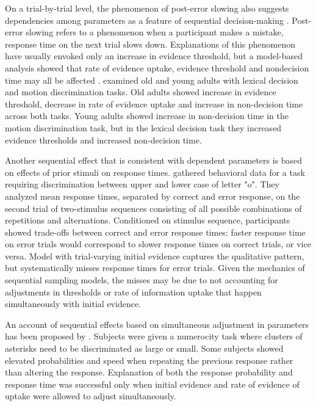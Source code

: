 \documentclass[12pt]{report}
\begin{document}
On a trial-by-trial level, the phenomenon of post-error slowing also suggests dependencies among parameters as a feature of sequential decision-making \citep{VanMal2004}. Post-error slowing refers to a phenomenon when a participant makes a mistake, response time on the next trial slows down. Explanations of this phenomenon have usually envoked only an increase in evidence threshold, but a model-based analysis showed that rate of evidence uptake, evidence threshold and nondecision time may all be affected \citep{DutFor2013}. \citet{DutFor2013} examined old and young adults with lexical decision and motion discrimination tasks. Old adults showed increase in evidence threshold, decrease in rate of evidence uptake and increase in non-decision time across both tasks. Young adults showed increase in non-decision time in the motion discrimination task, but in the lexical decision task they increased evidence thresholds and increased non-decision time. 

Another sequential effect that is consistent with dependent parameters is based on effects of prior stimuli on response times. \citet{GolWon2012} gathered behavioral data for a task requiring discrimination between upper and lower case of letter "o". They analyzed mean response times, separated by correct and error response, on the second trial of two-stimulus sequences consisting of all possible combinations of repetitions and alternations. Conditioned on stimulus sequence, participants showed trade-offs between correct and error response times: faster response time on error trials would correspond to slower response times on correct trials, or vice versa. Model with trial-varying initial evidence captures the qualitative pattern, but systematically misses response times for error trials. Given the mechanics of sequential sampling models, the misses may be due to not accounting for adjustments in thresholds or rate of information uptake that happen simultaneously with initial evidence.

An account of sequential effects based on simultaneous adjustment in parameters has been proposed by \citet{RatZan1999}. Subjects were given a numerocity task where clusters of asterisks need to be discriminated as large or small. Some subjects showed elevated probabilities and speed when repeating the previous response rather than altering the response. Explanation of both the response probability and response time was successful only when initial evidence and rate of evidence of uptake were allowed to adjust simultaneously. 
\end{document}
